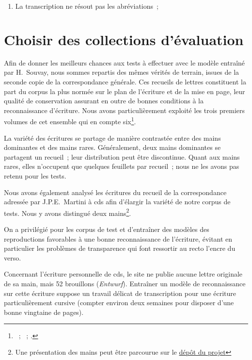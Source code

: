 \documentclass[a4paper,12pt,twoside]{book}
\begin{document}
				\begin{enumerate}
					\item La transcription ne résout pas les abréviations~;
				\end{enumerate}
				
		\section{Choisir des collections d'évaluation}
			Afin de donner les meilleurs chances aux tests à effectuer avec le modèle entraîné par H.~Souvay, nous sommes repartis des mêmes vérités de terrain, issues de la seconde copie de la correspondance générale. 	 Ces recueils de lettres constituent la part du corpus la plus normée sur le plan de l'écriture et de la mise en page, leur qualité de conservation assurant en outre de bonnes conditions à la reconnaissance d'écriture. Nous avons particulièrement exploité les trois premiers volumes de cet ensemble qui en compte six\footnote{\cite{salmCorrespondanceGeneraleSecondea}~; \cite{salmCorrespondanceGeneraleSeconde}~; \cite{salmCorrespondanceGeneraleSecondeb}.}.
			
			La variété des écritures se partage de manière contrastée entre des mains dominantes et des mains rares. Généralement, deux mains dominantes se partagent un recueil~; leur distribution peut être discontinue. Quant aux mains rares, elles n'occupent que quelques feuillets par recueil~; nous ne les avons pas retenu pour les tests.
			
			Nous avons également analysé les écritures du recueil de la correspondance adressée par J.P.E.~Martini à \gls{cds} afin d'élargir la variété de notre corpus de tests. Nous y avons distingué deux mains\footnote{Une présentation des mains peut être parcourue sur le \href{https://github.com/sbiay/CdS-edition/tree/main/htr/sources}{dépôt du projet}}.
			
			On a privilégié pour les corpus de test et d'entraîner des modèles des reproductions favorables à une bonne reconnaissance de l'écriture, évitant en particulier les problèmes de transparence qui font ressortir au recto l'encre du verso.
					
			Concernant l'écriture personnelle de \gls{cds}, le site ne publie aucune lettre originale de sa main, mais 52 brouillons (\textit{Entwurf}). Entraîner un modèle de reconnaissance sur cette écriture suppose un travail délicat de transcription pour une écriture particulièrement cursive (compter environ deux semaines pour disposer d'une bonne vingtaine de pages).
		
\end{document}
